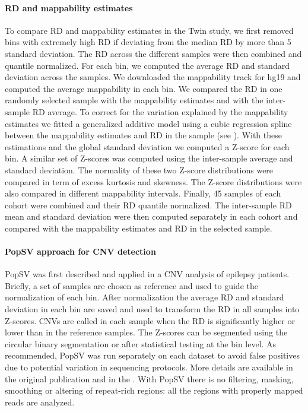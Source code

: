 \paragraph{RD and mappability estimates}
To compare RD and mappability estimates in the Twin study, we first removed bins with extremely high RD if deviating from the median RD by more than 5 standard deviation.
The RD across the different samples were then combined and quantile normalized.
For each bin, we computed the average RD and standard deviation across the samples.
We downloaded the mappability track for hg19\cite{Derrien2012} and computed the average mappability in each bin.
We compared the RD in one randomly selected sample with the mappability estimates and with the inter-sample RD average.
To correct for the variation explained by the mappability estimates we fitted a generalized additive model using a cubic regression spline between the mappability estimates and RD in the sample (see ).
With these estimations and the global standard deviation we computed a Z-score for each bin.
A similar set of Z-scores was computed using the inter-sample average and standard deviation.
The normality of these two Z-score distributions were compared in term of excess kurtosis and skewness.
The Z-score distributions were also compared in different mappability intervals.
Finally, 45 samples of each cohort were combined and their RD quantile normalized. 
The inter-sample RD mean and standard deviation were then computed separately in each cohort and compared with the mappability estimates and RD in the selected sample.

\paragraph{{\sf PopSV} approach for CNV detection}
{\sf PopSV} was first described and applied in a CNV analysis of epilepsy patients\cite{Monlong2018}.
Briefly, a set of samples are chosen as reference and used to guide the normalization of each bin.
After normalization the average RD and standard deviation in each bin are saved and used to transform the RD in all samples into Z-scores.
CNVs are called in each sample when the RD is significantly higher or lower than in the reference samples.
The Z-scores can be segmented using the circular binary segmentation\cite{Seshan2017} or after statistical testing at the bin level.
As recommended, {\sf PopSV} was run separately on each dataset to avoid false positives due to potential variation in sequencing protocols.
More details are available in the original publication\cite{Monlong2018} and in the .
With {\sf PopSV} there is no filtering, masking, smoothing or altering of repeat-rich regions: all the regions with properly mapped reads are analyzed.

